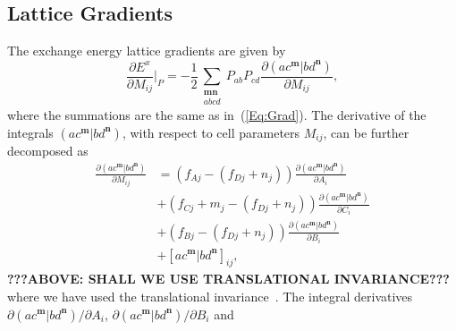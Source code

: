 \documentclass[prl,twocolumn,showpacs,twocolumngrid,superbib]{revtex4}
\begin{document}
\subsection{Lattice Gradients}
The exchange energy lattice gradients are given by
\begin{equation}\label{Eq:Xstress}
  \frac{\partial E^x}{\partial M_{ij}}\bigg|_P=
  -\frac{1}{2}\sum_{\substack{\mathbf{m}\mathbf{n}\\a b c d}}P_{ab}P_{cd}
  \frac{\partial(ac^\mathbf{m}|bd^\mathbf{n})}{\partial M_{ij}},
\end{equation}
where the summations are the same as in~(\ref{Eq:Grad}).
The derivative of the integrals $(ac^\mathbf{m}|bd^\mathbf{n})$, with respect 
to cell parameters $M_{ij}$, can be further decomposed as
\begin{equation}\label{Eq:DerMij}
  \begin{split}
    \frac{\partial (ac^\mathbf{m}|bd^\mathbf{n})}{\partial M_{ij}}
    &=(f_{Aj}-(f_{Dj}+n_j))\frac{\partial (ac^\mathbf{m}|bd^\mathbf{n})}{\partial A_{i}}\\
    &+(f_{Cj}+m_j-(f_{Dj}+n_j))\frac{\partial (ac^\mathbf{m}|bd^\mathbf{n})}{\partial C_{i}}\\
    &+(f_{Bj}-(f_{Dj}+n_j))\frac{\partial (ac^\mathbf{m}|bd^\mathbf{n})}{\partial B_{i}}\\
    &+[ac^\mathbf{m}|bd^\mathbf{n}]_{ij},
  \end{split}
\end{equation}
{\bf ???ABOVE: SHALL WE USE TRANSLATIONAL INVARIANCE???}\\
where we have used the translational invariance~\cite{AKorminicki77}. 
The integral derivatives $\partial (ac^\mathbf{m}|bd^\mathbf{n})/\partial A_{i}$, 
$\partial (ac^\mathbf{m}|bd^\mathbf{n})/\partial B_{i}$ and 
\end{document}
